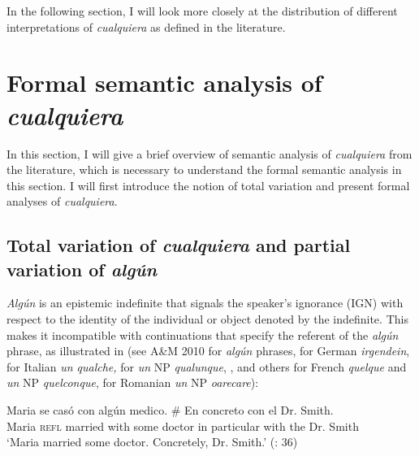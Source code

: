 In the following section, I will look more closely at the distribution of different interpretations of \textit{cualquiera} as defined in the literature.

\section{{Formal} {semantic} {analysis} {of} {\textit{cualquiera}}} \label{sec:2.2}

In this section, I will give a brief overview of semantic analysis of \textit{cualquiera} from the literature, which is necessary to understand the formal semantic analysis in this section. I will first introduce the notion of total variation and present formal analyses of \textit{cualquiera}.

\subsection{{Total} {variation} {of} {\textit{cualquiera}} {and} {partial} {variation} {of} {\textit{algún}}}  \label{sec:2.2.1}

\textit{Algún} is an epistemic indefinite that signals the speaker’s ignorance (IGN) with respect to the identity of the individual or object denoted by the indefinite. This makes it incompatible with continuations that specify the referent of the \textit{algún} phrase, as illustrated in  (see A\&M 2010 for \textit{algún} phrases, \citealt{Kratzer2002} for German \textit{irgendein}, \citealt{AloniPort2013} for Italian \textit{un qualche,} \citealt{Chierchia2006} for \textit{un} NP \textit{qualunque}, \citealt{JayezTovena2005}, and others for French \textit{quelque} and \textit{un} NP \textit{quelconque}, \citealt{Fălăuş2014} for Romanian \textit{un} NP \textit{oarecare}):

\ea \label{bkm:Ref533761877} %
\gll Maria se casó con algún medico. \# En concreto con el Dr. Smith.\\
Maria \textsc{refl} married with some doctor {} in particular with the Dr. Smith\\
  \glt ‘Maria married some doctor. Concretely, Dr. Smith.’
  \textup{(\citealt{am2013}: 36)} \\
\z 


